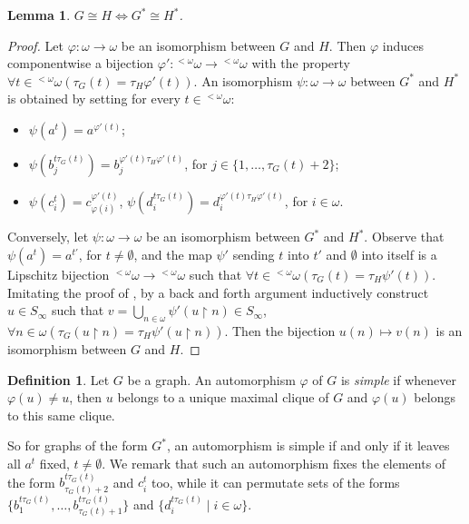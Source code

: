 \documentclass{amsart}
\newtheorem{lemma}[theorem]{Lemma}
\theoremstyle{definition}
\newtheorem{defin}[theorem]{Definition}
\theoremstyle{remark}
\begin{document}
\begin{lemma}\label{lemmaiso}
$G \cong H \iff G^* \cong H^*$.
\end{lemma}

\begin{proof}
Let $ {\varphi} \colon \omega \to \omega$ be an isomorphism between $G$ and $H$.
Then ${\varphi}$ induces componentwise a bijection ${\varphi}' \colon {{}^{<\omega}\omega} \to
{{}^{<\omega}\omega}$ with the property $\forall t \in {{}^{<\omega}\omega} (\tau_G(t)=\tau_H
{\varphi}'(t))$.
An isomorphism $\psi \colon \omega \to \omega$ between $G^*$ and $H^*$
is obtained by setting for every $t \in {{}^{<\omega}\omega}$:
\begin{itemize}
\item $\psi (a^t)=a^{{\varphi}'(t)}$;
\item $\psi (b_j^{t\tau_G(t)})=b_j^{ {\varphi}'(t)\tau_H {\varphi}'(t)}$, for $j
  \in \{ 1, \dotsc ,\tau_G(t)+2 \}$;
\item $\psi (c_i^t)=c_{{\varphi}(i)}^{{\varphi}'(t)}$,
  $\psi(d_i^{t\tau_G(t)})=d_i^{{\varphi}'(t)\tau_H {\varphi}'(t)}$, for $i\in
  \omega$.
\end{itemize}

Conversely, let $\psi \colon \omega \to \omega$ be an isomorphism
between $G^*$ and $H^*$.
Observe that $\psi(a^t)=a^{t'}$, for $t\neq\emptyset $, and the
map $\psi'$ sending $t$ into
$t'$ and $\emptyset$ into itself  is a Lipschitz bijection ${{}^{<\omega}\omega} \to {{}^{<\omega}\omega}$ such that
$\forall t \in {{}^{<\omega}\omega} (\tau_G(t)=\tau_H\psi'(t))$.
Imitating the proof of \cite{Camerlo2005}, by a back and forth argument inductively construct $u \in S_{\infty}$
such that $v = \bigcup_{n \in \omega} \psi'(u \restriction n) \in
S_\infty$, $\forall n \in \omega (\tau_G(u \restriction n)=\tau_H
\psi'(u \restriction n))$.
Then the bijection $u(n) \mapsto v(n)$ is an isomorphism between $G$ and $H$.
\end{proof}

\begin{defin}
Let $G$ be a graph.
An automorphism ${\varphi}$ of $G$ is \emph{simple} if whenever $ {\varphi} (u)
\neq u$, then $u$ belongs to a unique maximal clique of $G$ and
${\varphi}(u)$ belongs to this same clique.
\end{defin}

So for graphs of the form $G^*$, an automorphism is simple if and only
if it leaves  all $a^t$ fixed, $t\neq\emptyset $.
We remark that such an automorphism fixes the elements of the form
$b_{\tau_G(t)+2}^{t\tau_G(t)}$ and $c_i^t$ too,  while it can
permutate sets of the forms $\{ b_1^{t\tau_G(t)},\dotsc
,b_{\tau_G(t)+1}^{t\tau_G(t)}\} $ and $\{ d_i^{t\tau_G(t)} \mid i\in\omega \}$.
\end{document}
